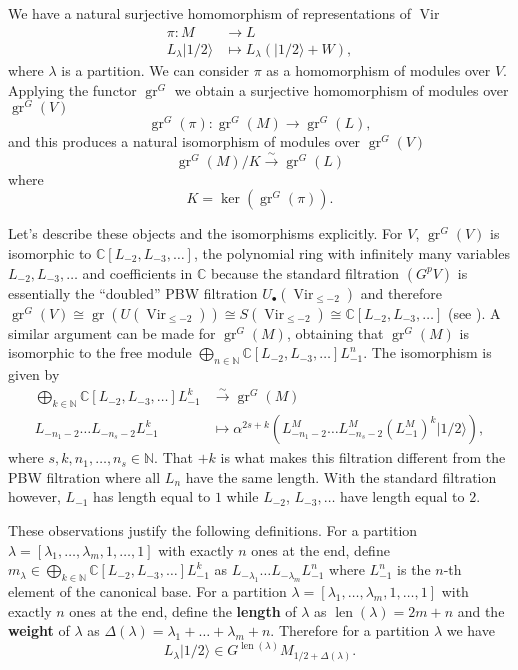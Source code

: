 \documentclass[12pt,a4paper]{article}
\DeclareMathOperator{\Vir}{Vir}
\DeclareMathOperator{\gr}{gr}
\DeclareMathOperator{\len}{len}
\newcommand{\vachalf}{|1/2\rangle}
\begin{document}
We have a natural surjective homomorphism of representations of $\Vir$
\begin{align*}
  \pi:M&\to L \\
  L_{\lambda}\vachalf&\mapsto L_\lambda(\vachalf+W),
\end{align*}
where $\lambda$ is a partition.
We can consider $\pi$ as a homomorphism of modules over $V$.
Applying the functor $\gr^G$ we obtain a surjective homomorphism of modules over $\gr^G(V)$
\begin{equation*}
  \gr^G(\pi):\gr^G(M)\to \gr^G(L),
\end{equation*}
and this produces a natural isomorphism of modules over $\gr^G(V)$
\begin{equation*}
  \gr^G(M)/K\xrightarrow{\sim} \gr^G(L)
\end{equation*}
where
\begin{equation*}
K=\ker(\gr^G(\pi)).
\end{equation*}

Let's describe these objects and the isomorphisms explicitly.
For $V$, $\gr^G(V)$ is isomorphic to $\mathbb{C}[L_{-2},L_{-3},\dots]$, the polynomial ring with infinitely many variables $L_{-2},L_{-3},\dots$ and coefficients in $\mathbb{C}$ because the standard filtration $(G^pV)$ is essentially the ``doubled'' PBW filtration $U_\bullet(\Vir_{\le -2})$ and therefore $\gr^G(V)\cong \gr(U(\Vir_{\le -2}))\cong S(\Vir_{\le -2})\cong \mathbb{C}[L_{-2},L_{-3},\dots]$ (see \cite[Chapter 2]{dixmier_enveloping_1996}).
A similar argument can be made for $\gr^G(M)$, obtaining that $\gr^G(M)$ is isomorphic to the free module $\bigoplus_{n\in \mathbb{N}}\mathbb{C}[L_{-2},L_{-3},\dots]L_{-1}^n$.
The isomorphism is given by
\begin{align*}
  \bigoplus_{k\in \mathbb{N}}\mathbb{C}[L_{-2},L_{-3},\dots]L_{-1}^k&\xrightarrow{\sim} \gr^G(M) \\
  L_{-n_1-2}\dots L_{-n_s-2}L_{-1}^k&\mapsto \alpha^{2s+k}(L_{-n_1-2}^M\dots L_{-n_s-2}^M(L_{-1}^M)^k\vachalf),
\end{align*}
where $s,k,n_1,\dots, n_s\in \mathbb{N}$.
That $+k$ is what makes this filtration different from the PBW filtration where all $L_n$ have the same length.
With the standard filtration however, $L_{-1}$ has length equal to $1$ while $L_{-2}$, $L_{-3},\dots$ have length equal to $2$.

These observations justify the following definitions.
For a partition $\lambda=[\lambda_1,\dots, \lambda_m,1,\dots,1]$ with exactly $n$ ones at the end, define $m_\lambda\in \bigoplus_{k\in \mathbb{N}}\mathbb{C}[L_{-2},L_{-3},\dots]L_{-1}^k$ as $L_{-\lambda_1}\dots L_{-\lambda_m}L_{-1}^n$ where $L_{-1}^n$ is the $n$-th element of the canonical base.
For a partition $\lambda=[\lambda_1,\dots, \lambda_m,1,\dots,1]$ with exactly $n$ ones at the end, define the \textbf{length} of $\lambda$ as $\len(\lambda)=2m+n$ and the \textbf{weight} of $\lambda$ as $\Delta(\lambda)=\lambda_1+\dots +\lambda_m+n$.
Therefore for a partition $\lambda$ we have
\begin{equation*}
  L_{\lambda}\vachalf\in G^{\len(\lambda)}M_{1/2+\Delta(\lambda)}.
\end{equation*}
\end{document}
